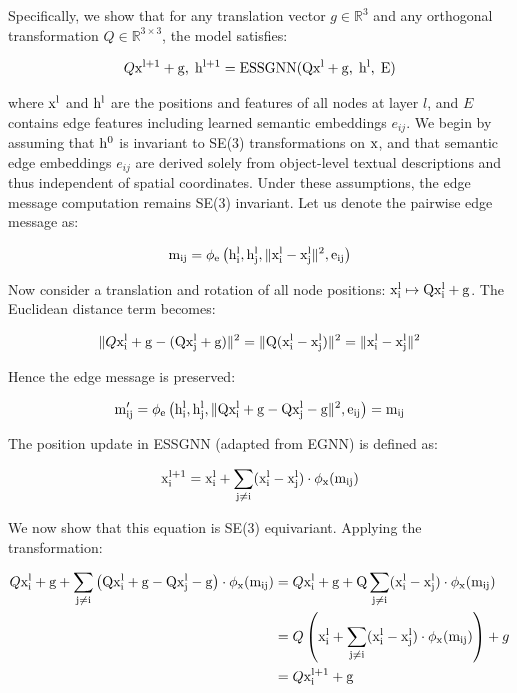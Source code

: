 Specifically, we show that for any translation vector \( g \in \mathbb{R}^3 \) and any orthogonal transformation \( Q \in \mathbb{R}^{3 \times 3} \), the model satisfies:

\begin{equation}
    Q\rm x^{l+1} + g,\; \rm h^{l+1} = \mathrm{ESSGNN}(Q\rm x^l + g,\; \rm h^l,\; E)
\end{equation}

where \( \rm x^l \) and \( \rm h^l \) are the positions and features of all nodes at layer \( l \), and \( E \) contains edge features including learned semantic embeddings \( e_{ij} \). We begin by assuming that \( \rm h^0 \) is invariant to SE(3) transformations on \( \rm x \), and that semantic edge embeddings \( e_{ij} \) are derived solely from object-level textual descriptions and thus independent of spatial coordinates. Under these assumptions, the edge message computation remains SE(3) invariant. Let us denote the pairwise edge message as:

\begin{equation}
    \rm m_{ij} = \phi_e\left(\rm h_i^l, \rm h_j^l, \| \rm x_i^l - \rm x_j^l \|^2, e_{ij} \right)
\end{equation}
    
Now consider a translation and rotation of all node positions: \( \rm x_i^l \mapsto Q\rm x_i^l + g \). The Euclidean distance term becomes:

\begin{equation}
    \| Q\rm x_i^l + g - (Q\rm x_j^l + g) \|^2 = \| Q(\rm x_i^l - \rm x_j^l) \|^2 = \| \rm x_i^l - \rm x_j^l \|^2
\end{equation}

Hence the edge message is preserved:

\begin{equation}
    \rm m_{ij}' = \phi_e\left(\rm h_i^l, \rm h_j^l, \| Q\rm x_i^l + g - Q\rm x_j^l - g \|^2, e_{ij} \right) = \rm m_{ij}
\end{equation}

The position update in ESSGNN (adapted from EGNN) is defined as:

\begin{equation}
    \rm x_i^{l+1} = \rm x_i^l + \sum_{j \ne i} (\rm x_i^l - \rm x_j^l) \cdot \phi_x(\rm m_{ij})
\end{equation}

We now show that this equation is SE(3) equivariant. Applying the transformation:

\begin{align*}
    Q\rm x_i^l + g + \sum_{j \ne i} \left( Q\rm x_i^l + g - Q\rm x_j^l - g \right) \cdot \phi_x(\rm m_{ij}) &= Q\rm x_i^l + g + Q \sum_{j \ne i} (\rm x_i^l - \rm x_j^l) \cdot \phi_x(\rm m_{ij}) \\
    &= Q \left( \rm x_i^l + \sum_{j \ne i} (\rm x_i^l - \rm x_j^l) \cdot \phi_x(\rm m_{ij}) \right) + g \\
    &= Q\rm x_i^{l+1} + g
\end{align*}

